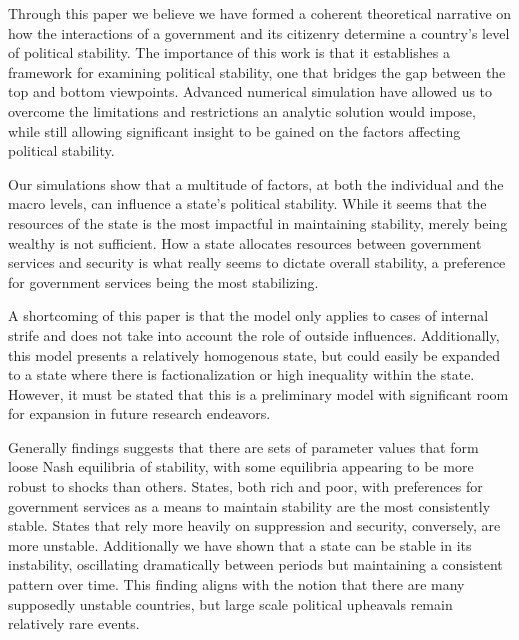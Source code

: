 \documentclass[12pt]{article}
\begin{document}
\begin{spacing}{1.5}
Through this paper we believe we have formed a coherent theoretical narrative on how the interactions of a government and its citizenry determine a country's level of political stability. The importance of this work is that it establishes a framework for examining political stability, one that bridges the gap between the top and bottom viewpoints. Advanced numerical simulation have allowed us to overcome the limitations and restrictions an analytic solution would impose, while still allowing significant insight to be gained on the factors affecting political stability. 
 
Our simulations show that a multitude of factors, at both the individual and the macro levels, can influence a state’s political stability. While it seems that the resources of the state is the most impactful in maintaining stability, merely being wealthy is not sufficient. How a state allocates resources between government services and security is what really seems to dictate overall stability, a preference for government services being the most stabilizing. 
 
A shortcoming of this paper is that the model only applies to cases of internal strife and does not take into account the role of outside influences. Additionally, this model presents a relatively homogenous state, but could easily be expanded to a state where there is factionalization or high inequality within the state. However, it must be stated that this is a preliminary model with significant room for expansion in future research endeavors. 
 
Generally findings suggests that there are sets of parameter values that form loose Nash equilibria of stability, with some equilibria appearing to be more robust to shocks than others. States, both rich and poor, with preferences for government services as a means to maintain stability are the most consistently stable. States that rely more heavily on suppression and security, conversely, are more unstable. Additionally we have shown that a state can be stable in its instability, oscillating dramatically between periods but maintaining a consistent pattern over time. This finding aligns with the notion that there are many supposedly unstable countries, but large scale political upheavals remain relatively rare events. 
 

 

\end{spacing}


\pagebreak




\nocite{*}
\end{document}
